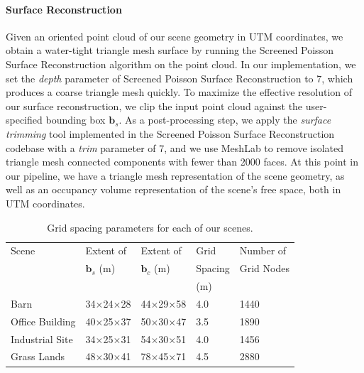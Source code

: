 \vspace{-12pt}
\paragraph{Surface Reconstruction}
Given an oriented point cloud of our scene geometry in UTM coordinates, we obtain a water-tight triangle mesh surface by running the Screened Poisson Surface Reconstruction algorithm \cite{kazhdan:2013} on the point cloud.
In our implementation, we set the \emph{depth} parameter of Screened Poisson Surface Reconstruction to 7, which produces a coarse triangle mesh quickly.
To maximize the effective resolution of our surface reconstruction, we clip the input point cloud against the user-specified bounding box $\mathbf{b}_s$.
As a post-processing step, we apply the \emph{surface trimming} tool implemented in the Screened Poisson Surface Reconstruction codebase with a \emph{trim} parameter of 7, and we use MeshLab \cite{cignoni:2008} to remove isolated triangle mesh connected components with fewer than 2000 faces.
At this point in our pipeline, we have a triangle mesh representation of the scene geometry, as well as an occupancy volume representation of the scene's free space, both in UTM coordinates.

\begin{table}[t]
\centering
\footnotesize
\begin{tabular}{@{}lllll@{}}
\toprule
Scene           & Extent of              & Extent of              & Grid    & Number of  \\
                & $\mathbf{b}_s$ (m)     & $\mathbf{b}_c$ (m)     & Spacing & Grid Nodes \\
                &                        &                        & (m)     & \\
\midrule
Barn            & 34$\times$24$\times$28 & 44$\times$29$\times$58 & 4.0     & 1440 \\
Office Building & 40$\times$25$\times$37 & 50$\times$30$\times$47 & 3.5     & 1890 \\
Industrial Site & 34$\times$25$\times$31 & 54$\times$30$\times$51 & 4.0     & 1456 \\
Grass Lands     & 48$\times$30$\times$41 & 78$\times$45$\times$71 & 4.5     & 2880 \\
\bottomrule
\end{tabular}
\normalsize
\vspace{5pt}
\caption{
Grid spacing parameters for each of our scenes.
}
\vspace{-5pt}
\label{tbl:grid}
\end{table}


